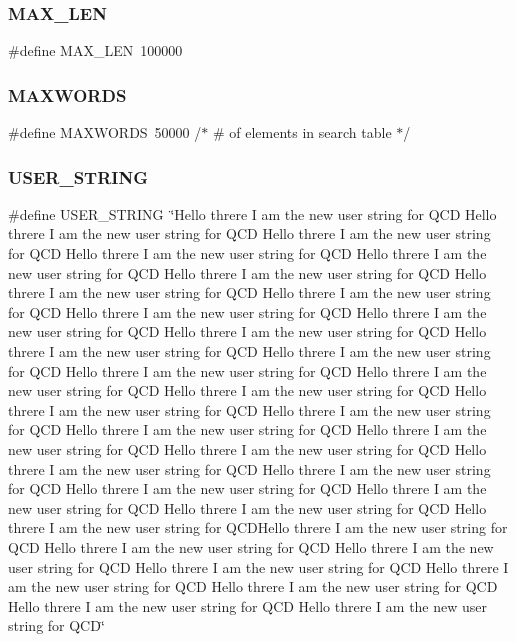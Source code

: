 \subsubsection{\texorpdfstring{MAX\_LEN}{MAX\_LEN}}
{\footnotesize\ttfamily \#define M\+A\+X\+\_\+\+L\+EN~100000}

\mbox{\label{adat-devel_2other__libs_2filedb_2filehash_2tcreate_8c_aa6b319146daf33409da1bbe4194553dc}} 
\subsubsection{\texorpdfstring{MAXWORDS}{MAXWORDS}}
{\footnotesize\ttfamily \#define M\+A\+X\+W\+O\+R\+DS~50000             /$\ast$ \# of elements in search table $\ast$/}

\mbox{\label{adat-devel_2other__libs_2filedb_2filehash_2tcreate_8c_a5fdc86a0c07ccece3ef65e2f46c0ffd4}} 
\subsubsection{\texorpdfstring{USER\_STRING}{USER\_STRING}}
{\footnotesize\ttfamily \#define U\+S\+E\+R\+\_\+\+S\+T\+R\+I\+NG~\char`\"{}Hello threre I am the new user string for Q\+CD Hello threre I am the new user string for Q\+CD Hello threre I am the new user string for Q\+CD Hello threre I am the new user string for Q\+CD Hello threre I am the new user string for Q\+CD Hello threre I am the new user string for Q\+CD Hello threre I am the new user string for Q\+CD Hello threre I am the new user string for Q\+CD Hello threre I am the new user string for Q\+CD Hello threre I am the new user string for Q\+CD Hello threre I am the new user string for Q\+CD Hello threre I am the new user string for Q\+CD Hello threre I am the new user string for Q\+CD Hello threre I am the new user string for Q\+CD Hello threre I am the new user string for Q\+CD Hello threre I am the new user string for Q\+CD Hello threre I am the new user string for Q\+CD Hello threre I am the new user string for Q\+CD Hello threre I am the new user string for Q\+CD Hello threre I am the new user string for Q\+CD Hello threre I am the new user string for Q\+CD Hello threre I am the new user string for Q\+CD Hello threre I am the new user string for Q\+CD Hello threre I am the new user string for Q\+CD Hello threre I am the new user string for Q\+CD Hello threre I am the new user string for Q\+CD Hello threre I am the new user string for Q\+C\+D\+Hello threre I am the new user string for Q\+CD  Hello threre I am the new user string for Q\+CD Hello threre I am the new user string for Q\+CD Hello threre I am the new user string for Q\+CD Hello threre I am the new user string for Q\+CD Hello threre I am the new user string for Q\+CD Hello threre I am the new user string for Q\+CD Hello threre I am the new user string for Q\+CD\char`\"{}}



